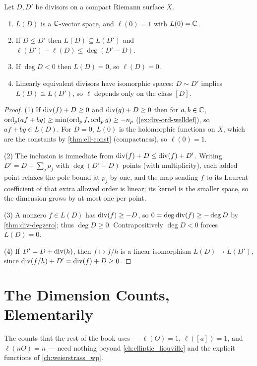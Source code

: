 \begin{proposition}
\label{prop:rr-LD-props}
Let \(D, D'\) be divisors on a compact Riemann surface \(X\).
\begin{enumerate}
\item \(L(D)\) is a \(\mathbb{C}\)-vector space, and \(\ell(0) = 1\) with \(L(0) = \mathbb{C}\).
\item If \(D \le D'\) then \(L(D) \subseteq L(D')\) and
  \(\ell(D') - \ell(D) \le \deg(D' - D)\).
\item If \(\deg D < 0\) then \(L(D) = 0\), so \(\ell(D) = 0\).
\item Linearly equivalent divisors have isomorphic spaces: \(D \sim D'\) implies
  \(L(D) \cong L(D')\), so \(\ell\) depends only on the class \([D]\).
\end{enumerate}
\end{proposition}

\begin{proof}
(1) If \(\operatorname{div}(f) + D \ge 0\) and \(\operatorname{div}(g) + D \ge 0\) then for
\(a, b \in \mathbb{C}\), \(\operatorname{ord}_p(af+bg) \ge \min(\operatorname{ord}_p f, \operatorname{ord}_p g) \ge -n_p\)
(\cref{ex:div-ord-welldef}), so \(af + bg \in L(D)\). For \(D = 0\), \(L(0)\) is
the holomorphic functions on \(X\), which are the constants by
\cref{thm:ell-const} (compactness), so \(\ell(0) = 1\).

(2) The inclusion is immediate from \(\operatorname{div}(f) + D \le \operatorname{div}(f) + D'\).
Writing \(D' = D + \sum_j p_j\) with \(\deg(D'-D)\) points (with multiplicity),
each added point relaxes the pole bound at \(p_j\) by one, and the map sending
\(f\) to its Laurent coefficient of that extra allowed order is linear; its
kernel is the smaller space, so the dimension grows by at most one per point.

(3) A nonzero \(f \in L(D)\) has \(\operatorname{div}(f) \ge -D\), so
\(0 = \deg\operatorname{div}(f) \ge -\deg D\) by \cref{thm:div-degzero}; thus
\(\deg D \ge 0\). Contrapositively \(\deg D < 0\) forces \(L(D) = 0\).

(4) If \(D' = D + \operatorname{div}(h)\), then \(f \mapsto f/h\) is a linear isomorphism
\(L(D) \to L(D')\), since \(\operatorname{div}(f/h) + D' = \operatorname{div}(f) + D \ge 0\).
\end{proof}

\section{The Dimension Counts, Elementarily}
\label{sec:rr-counts}

The counts that the rest of the book uses --- \(\ell(O) = 1\), \(\ell([a]) = 1\),
and \(\ell(nO) = n\) --- need nothing beyond \cref{ch:elliptic_liouville} and the
explicit functions of \cref{ch:weierstrass_wp}.

